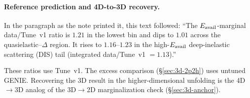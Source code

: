 \paragraph{Reference prediction and 4D-to-3D recovery.} In the paragraph as the note printed it, this text followed: ``The $E_{\mathrm{avail}}$-marginal data/Tune~v1 ratio is $1.21$ in the lowest bin and dips to $1.01$ across the quasielastic--$\Delta$ region. It rises to $1.16$--$1.23$ in the high-$E_{\mathrm{avail}}$ deep-inelastic scattering (DIS) tail (integrated data/Tune~v1 $=1.13$).''\par These ratios use Tune~v1. The excess comparison (\S\ref{sec:3d-2p2h}) uses untuned GENIE. Recovering the 3D result in the higher-dimensional unfolding is the 4D$\to$3D analog of the 3D$\to$2D marginalization check (\S\ref{sec:3d-anchor}).

